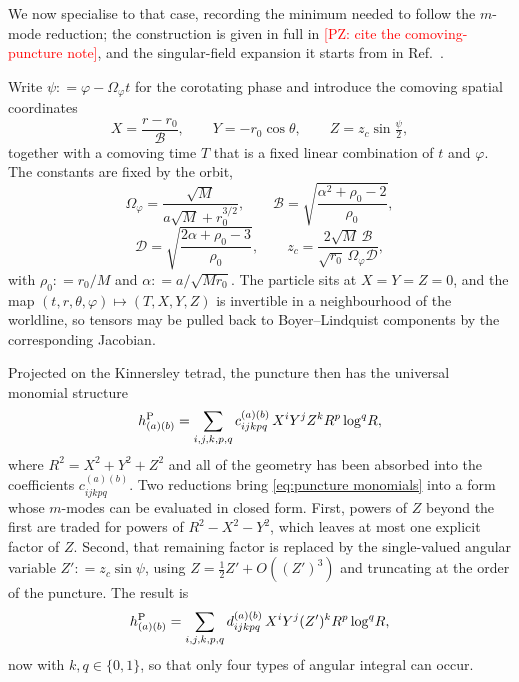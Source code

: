 \documentclass[%
reprint,
 prd,
superscriptaddress,
nofootinbib,
aps,
dvipsnames
]{revtex4-2}
\newcommand{\PZ}[1]{\textcolor{red}{\textsf{[PZ: #1]}}}
\def\defeq{\mathrel{\mathop{:}}=}
\begin{document}
We now specialise to that case, recording the minimum needed to follow the
$m$-mode reduction; the construction is given in full in
\PZ{cite the comoving-puncture note}, and the singular-field expansion it
starts from in Ref.~\cite{Bourg:2024cgh}.

Write $\psi \defeq \varphi - \Omega_\varphi t$ for the corotating phase and
introduce the comoving spatial coordinates
\begin{equation}\label{eq:comoving chart}
  X = \frac{r-r_{0}}{\mathcal B},
  \qquad
  Y = -r_{0}\cos\theta,
  \qquad
  Z = z_{c}\sin\tfrac{\psi}{2},
\end{equation}
together with a comoving time $T$ that is a fixed linear combination of $t$
and $\varphi$. The constants are fixed by the orbit,
\begin{equation}\label{eq:comoving constants}
  \Omega_\varphi = \frac{\sqrt M}{a\sqrt M + r_{0}^{3/2}},
  \qquad
  \mathcal B = \sqrt{\frac{\alpha^{2}+\rho_{0}-2}{\rho_{0}}},
\end{equation}
\begin{equation}\label{eq:comoving constants 2}
  \mathcal D = \sqrt{\frac{2\alpha+\rho_{0}-3}{\rho_{0}}},
  \qquad
  z_{c} = \frac{2\sqrt{M}\,\mathcal B}{\sqrt{r_{0}}\,\Omega_\varphi \mathcal D},
\end{equation}
with $\rho_{0}\defeq r_{0}/M$ and $\alpha \defeq a/\sqrt{Mr_{0}}$.
The particle sits at $X=Y=Z=0$, and the map
$(t,r,\theta,\varphi)\mapsto(T,X,Y,Z)$ is invertible in a neighbourhood of
the worldline, so tensors may be pulled back to Boyer--Lindquist components
by the corresponding Jacobian.

Projected on the Kinnersley tetrad, the puncture then has the universal
monomial structure
\begin{equation}\label{eq:puncture monomials}
  h^{\rm P}_{(a)(b)}
  = \sum_{i,j,k,p,q} c^{(a)(b)}_{ijkpq}\,
    X^{i}Y^{j}Z^{k}R^{p}\log^{q}\!R ,
\end{equation}
where $R^{2}=X^{2}+Y^{2}+Z^{2}$ and all of the geometry has been absorbed
into the coefficients $c^{(a)(b)}_{ijkpq}$. Two reductions bring
\eqref{eq:puncture monomials} into a form whose $m$-modes can be evaluated in
closed form. First, powers of $Z$ beyond the first are traded for powers of
$R^{2}-X^{2}-Y^{2}$, which leaves at most one explicit factor of $Z$. Second,
that remaining factor is replaced by the single-valued angular variable
$Z' \defeq z_{c}\sin\psi$, using
$Z = \tfrac12 Z' + O\!\left((Z')^{3}\right)$ and truncating at the order of
the puncture. The result is
\begin{equation}\label{eq:puncture reduced}
  h^{\rm P}_{(a)(b)}
  = \sum_{i,j,k,p,q} d^{(a)(b)}_{ijkpq}\,
    X^{i}Y^{j}(Z')^{k}R^{p}\log^{q}\!R ,
\end{equation}
now with $k,q\in\{0,1\}$, so that only four types of angular integral can
occur.
\end{document}
